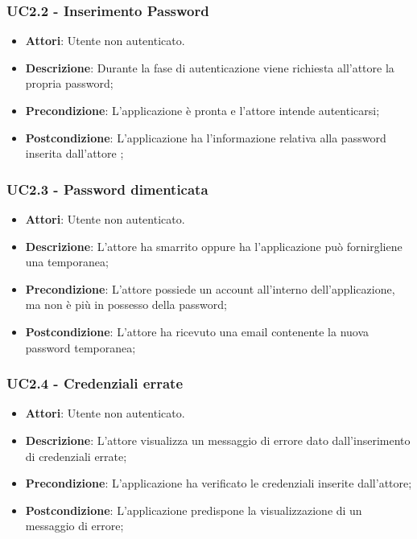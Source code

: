\subsubsection{UC2.2 - Inserimento Password} 
\label{sssec:UC2.2} 
\begin{itemize} 
\item \textbf{Attori}: Utente non autenticato.
\item \textbf{Descrizione}: Durante la fase di autenticazione viene richiesta all'attore la propria password;
\item \textbf{Precondizione}: L'applicazione è pronta e l'attore intende autenticarsi;
\item \textbf{Postcondizione}: L'applicazione ha l’informazione relativa alla password inserita dall’attore
;
\end{itemize} 
\subsubsection{UC2.3 - Password dimenticata} 
\label{sssec:UC2.3} 
\begin{itemize} 
\item \textbf{Attori}: Utente non autenticato.
\item \textbf{Descrizione}: L'attore ha smarrito oppure ha l'applicazione può fornirgliene una temporanea;
\item \textbf{Precondizione}: L'attore possiede un account all'interno dell'applicazione, ma non è più in possesso della password;
\item \textbf{Postcondizione}: L'attore ha ricevuto una email contenente la nuova password temporanea;
\end{itemize} 
\subsubsection{UC2.4 - Credenziali errate} 
\label{sssec:UC2.4} 
\begin{itemize} 
\item \textbf{Attori}: Utente non autenticato.
\item \textbf{Descrizione}: L’attore visualizza un messaggio di errore dato dall’inserimento di credenziali errate;
\item \textbf{Precondizione}: L'applicazione ha verificato le credenziali inserite dall’attore;
\item \textbf{Postcondizione}: L'applicazione predispone la visualizzazione di un messaggio di errore;
\end{itemize} 
